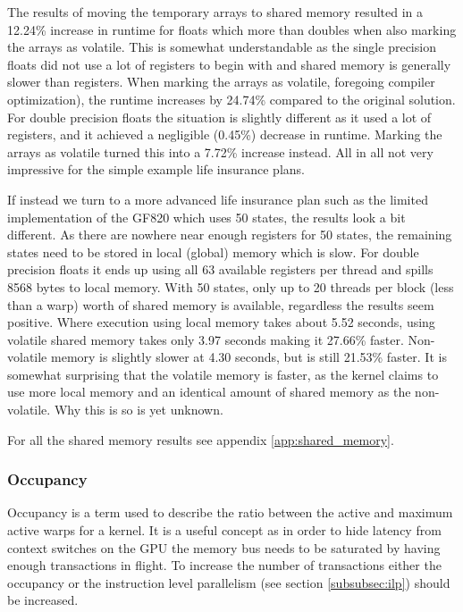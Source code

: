 The results of moving the temporary arrays to shared memory resulted in a 12.24\% increase in runtime for floats which more than doubles when also marking the arrays as volatile.
This is somewhat understandable as the single precision floats did not use a lot of registers to begin with and shared memory is generally slower than registers.
When marking the arrays as volatile, foregoing compiler optimization), the runtime increases by 24.74\% compared to the original solution.
For double precision floats the situation is slightly different as it used a lot of registers, and it achieved a negligible (0.45\%) decrease in runtime.
Marking the arrays as volatile turned this into a 7.72\% increase instead.
All in all not very impressive for the simple example life insurance plans.

If instead we turn to a more advanced life insurance plan such as the limited implementation of the GF820 which uses 50 states, the results look a bit different.
As there are nowhere near enough registers for 50 states, the remaining states need to be stored in local (global) memory which is slow.
For double precision floats it ends up using all 63 available registers per thread and spills 8568 bytes to local memory.
With 50 states, only up to 20 threads per block (less than a warp) worth of shared memory is available, regardless the results seem positive.
Where execution using local memory takes about 5.52 seconds, using volatile shared memory takes only 3.97 seconds making it 27.66\% faster.
Non-volatile memory is slightly slower at 4.30 seconds, but is still 21.53\% faster.
It is somewhat surprising that the volatile memory is faster, as the kernel claims to use more local memory and an identical amount of shared memory as the non-volatile.
Why this is so is yet unknown.

For all the shared memory results see appendix \ref{app:shared_memory}.




\subsubsection{Occupancy}\label{subsubsec:occupancy}
Occupancy is a term used to describe the ratio between the active and maximum active warps for a kernel.
It is a useful concept as in order to hide latency from context switches on the GPU the memory bus needs to be saturated by having enough transactions in flight.
To increase the number of transactions either the occupancy or the instruction level parallelism (see section \ref{subsubsec:ilp}) should be increased.

